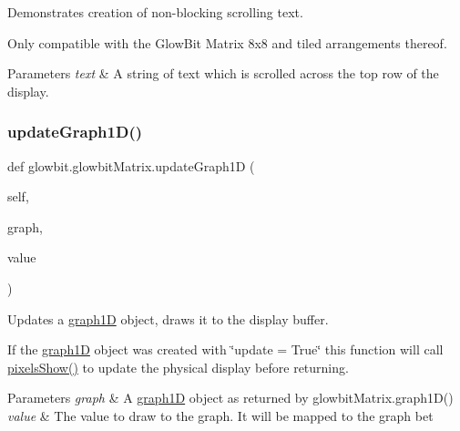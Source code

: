 Demonstrates creation of non-\/blocking scrolling text. 

Only compatible with the Glow\+Bit Matrix 8x8 and tiled arrangements thereof.


\begin{DoxyParams}{Parameters}
{\em text} & A string of text which is scrolled across the top row of the display. \\
\hline
\end{DoxyParams}
\mbox{\label{classglowbit_1_1glowbitMatrix_a0d44976cdc12728d9ae80c2d901029c0}} 
\subsubsection{\texorpdfstring{update\+Graph1\+D()}{updateGraph1D()}}
{\footnotesize\ttfamily def glowbit.\+glowbit\+Matrix.\+update\+Graph1D (\begin{DoxyParamCaption}\item[{}]{self,  }\item[{}]{graph,  }\item[{}]{value }\end{DoxyParamCaption})}



Updates a \hyperlink{classglowbit_1_1glowbitMatrix_1_1graph1D}{graph1D} object, draws it to the display buffer. 

If the \hyperlink{classglowbit_1_1glowbitMatrix_1_1graph1D}{graph1D} object was created with \char`\"{}update = True\char`\"{} this function will call \hyperlink{classglowbit_1_1glowbit_a051aed2a4969fdcb0466e4e840209279}{pixels\+Show()} to update the physical display before returning.


\begin{DoxyParams}{Parameters}
{\em graph} & A \hyperlink{classglowbit_1_1glowbitMatrix_1_1graph1D}{graph1D} object as returned by glowbit\+Matrix.\+graph1\+D() \\
\hline
{\em value} & The value to draw to the graph. It will be mapped to the graph bet \\
\hline
\end{DoxyParams}
\mbox{\label{classglowbit_1_1glowbitMatrix_ae9083babec0d5004363782540b60baed}} 

